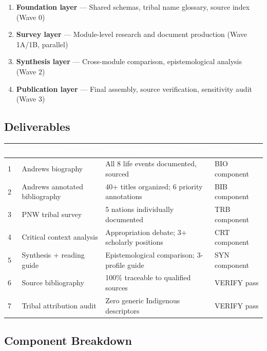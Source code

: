 \documentclass[11pt,letterpaper]{article}
\newcommand{\tableheader}[1]{\textbf{\sffamily\textcolor{white}{#1}}}
\begin{document}
\begin{enumerate}
  \item \textbf{Foundation layer} --- Shared schemas, tribal name glossary, source index (Wave 0)
  \item \textbf{Survey layer} --- Module-level research and document production (Wave 1A/1B, parallel)
  \item \textbf{Synthesis layer} --- Cross-module comparison, epistemological analysis (Wave 2)
  \item \textbf{Publication layer} --- Final assembly, source verification, sensitivity audit (Wave 3)
\end{enumerate}

\subsection{Deliverables}

\begin{center}
\begin{tabularx}{\textwidth}{C{0.5cm}L{3.5cm}L{4cm}L{3.5cm}}
\toprule
{}
\tableheader{\#} & \tableheader{Deliverable} & \tableheader{Acceptance Criteria} & \tableheader{Spec} \\
 & Andrews biography & All 8 life events documented, sourced & BIO component \\
2 & Andrews annotated bibliography & 40+ titles organized; 6 priority annotations & BIB component \\
3 & PNW tribal survey & 5 nations individually documented & TRB component \\
4 & Critical context analysis & Appropriation debate; 3+ scholarly positions & CRT component \\
5 & Synthesis + reading guide & Epistemological comparison; 3-profile guide & SYN component \\
6 & Source bibliography & 100\% traceable to qualified sources & VERIFY pass \\
7 & Tribal attribution audit & Zero generic Indigenous descriptors & VERIFY pass \\
\bottomrule
\end{tabularx}
\end{center}

\subsection{Component Breakdown}
\end{document}
